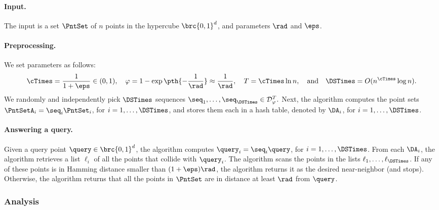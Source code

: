 \paragraph{Input.}
The input is a set $\PntSet$ of $n$ points in the hypercube
$\brc{0,1}^d$, and parameters $\rad$ and $\eps$.

\paragraph{Preprocessing.}
We set parameters as follows:
\begin{align*}
  \cTimes = \frac{1}{1+\eps} \in (0,1),%
  \quad  %
  \pr = 1 - \exp \pth{ - \frac{1}{\rad}} \approx \frac{1}{\rad},
  \quad %
  \tTimes = \cTimes \ln n,
  \quad
  \text{and}%
  \quad
  \DSTimes = O( n^{\cTimes} \log n).
\end{align*}
We randomly and independently pick $\DSTimes$ sequences
\begin{math}
    \seq_1, \ldots, \seq_\DSTimes \in \DistD{\pr}^\tTimes.
\end{math}
Next, the algorithm computes the point sets
$\PntSetA_i = \seq_i \PntSet_i$, for $i=1,\ldots, \DSTimes$, and
stores them each in a hash table, denoted by $\DA_i$, for
$i=1,\ldots, \DSTimes$.

\paragraph{Answering a query.}

Given a query point $\query \in \brc{0,1}^d$, the algorithm computes
$\query_i = \seq_i \query$, for $i=1,\ldots, \DSTimes$.  From each
$\DA_i$, the algorithm retrieves a list $\ell_i$ of all the points
that collide with $\query_i$. The algorithm scans the points in the
lists $\ell_1, \ldots, \ell_\DSTimes$. If any of these points is in
Hamming distance smaller than $(1+\eps)\rad$, the algorithm returns it
as the desired near-neighbor (and stops). Otherwise, the algorithm
returns that all the points in $\PntSet$ are in distance at least
$\rad$ from $\query$.

\subsubsection{Analysis}


